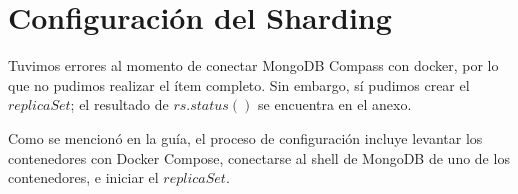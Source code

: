 \section{Configuración del Sharding}

Tuvimos errores al momento de conectar MongoDB Compass con docker, por lo que no pudimos realizar el ítem completo.
Sin embargo, sí pudimos crear el $replicaSet$; el resultado de $rs.status()$ se encuentra en el anexo.

Como se mencionó en la guía, el proceso de configuración incluye levantar los contenedores con Docker Compose, conectarse
al shell de MongoDB de uno de los contenedores, e iniciar el $replicaSet$.